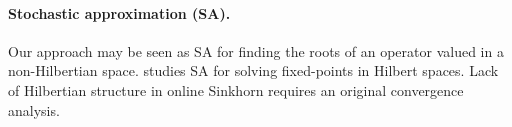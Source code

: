 \paragraph{Stochastic approximation (SA).} Our approach may be seen as SA \cite{robbins_stochastic_1951} for finding the roots of an
operator valued in a non-Hilbertian space. \cite{alber_stochastic_2012} studies
SA for solving fixed-points in Hilbert spaces. Lack of Hilbertian structure in online Sinkhorn requires an original convergence analysis.